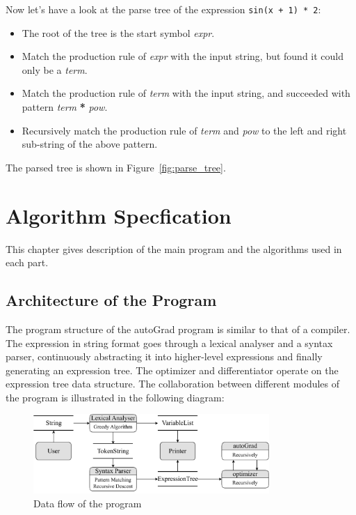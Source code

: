 \documentclass[a4paper,oneside]{book}
\begin{document}
Now let's have a look at the parse tree of the expression \verb|sin(x + 1) * 2|:

\begin{itemize}
    \item The root of the tree is the start symbol \textit{expr}.
    \item Match the production rule of \textit{expr} with the input string, but found it could only be a \textit{term}.
    \item Match the production rule of \textit{term} with the input string, and succeeded with pattern \textit{term} \textbf{*} \textit{pow}.
    \item Recursively match the production rule of \textit{term} and \textit{pow} to the left and right sub-string of the above pattern.
\end{itemize}

The parsed tree is shown in Figure~\ref{fig:parse_tree}.

\chapter{Algorithm Specfication}
\label{chap:algorithm}

This chapter gives description of the main program and the algorithms used in each part.

\section{Architecture of the Program}

The program structure of the autoGrad program is similar to that of a compiler. The expression in string format goes through a lexical analyser and a syntax parser, continuously abstracting it into higher-level expressions and finally generating an expression tree. The optimizer and differentiator operate on the expression tree data structure. The collaboration between different modules of the program is illustrated in the following diagram:

\begin{figure}[!ht]
    \caption{Data flow of the program}
    \centering
    \includegraphics[width=0.8\textwidth]{src/dataflow.drawio.pdf}
\end{figure}
\end{document}
